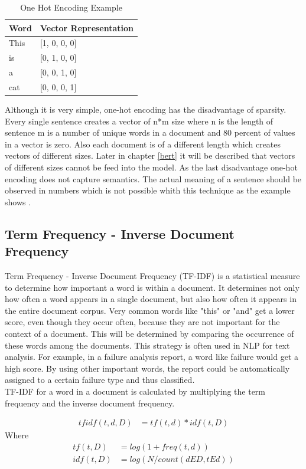 \begin{table}[H]
	\centering
	\begin{tabular}{ll}
		\hline
		\textbf{Word} & \textbf{Vector Representation} \\ \hline
		This & [1, 0, 0, 0]\\ 
		is    & [0, 1, 0, 0]\\ 
		a & [0, 0, 1, 0]\\ 
		cat  & [0, 0, 0, 1]\\ \hline
	\end{tabular}
	\caption{One Hot Encoding Example}
	\label{tab:onehot}
\end{table}

Although it is very simple, one-hot encoding has the disadvantage of sparsity. Every single sentence creates a vector of n*m size where n is the length of sentence m is a number of unique words in a document and 80 percent of values in a vector is zero. Also each document is of a different length which creates vectors of different sizes. Later in chapter \ref{bert} it will be described that vectors of different sizes cannot be feed into the model.
As the last disadvantage one-hot encoding does not capture semantics. The actual meaning of a sentence should be observed in numbers which is not possible whith this technique as the example shows \cite{onehot}.

\subsection{Term Frequency - Inverse Document Frequency}
Term Frequency - Inverse Document Frequency (TF-IDF) is a statistical measure to determine how important a word is within a document. It determines not only how often a word appears in a single document, but also how often it appears in the entire document corpus. Very common words like "this" or "and" get a lower score, even though they occur often, because they are not important for the context of a document. This will be determined by comparing the occurrence of these words among the documents. This strategy is often used in NLP for text analysis. For example, in a failure analysis report, a word like failure would get a high score. By using other important words, the report could be automatically assigned to a certain failure type and thus classified. \\
TF-IDF for a word in a document is calculated by multiplying the term frequency and the inverse document frequency.

\begin{align}
	tf idf (t, d, D) &= tf(t, d) * idf(t, D)
\end{align}
Where
\begin{align}
	tf (t, D) &= log(1 + freq(t, d)) \\
	idf(t, D) &= log(N/count(d E D, t E d))
\end{align}

